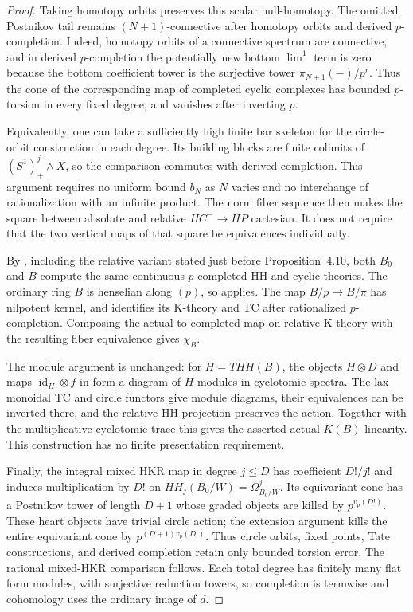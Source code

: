 \documentclass[11pt,a4paper]{amsart}
\numberwithin{equation}{section}
\theoremstyle{definition}
\theoremstyle{remark}
\begin{document}
\begin{proof}
Taking homotopy orbits preserves this scalar null-homotopy.
The omitted Postnikov tail remains $(N+1)$-connective after
homotopy orbits and derived $p$-completion. Indeed, homotopy
orbits of a connective spectrum are connective, and in derived
$p$-completion the potentially new bottom $\lim^1$ term is zero
because the bottom coefficient tower is the surjective tower
$\pi_{N+1}(-)/p^r$. Thus the cone of the corresponding map of
completed cyclic complexes has bounded $p$-torsion in every fixed
degree, and vanishes after inverting $p$.

Equivalently, one can take a sufficiently high finite bar skeleton
for the circle-orbit construction in each degree. Its building blocks
are finite colimits of $(S^1)^j_+\wedge X$, so the comparison commutes
with derived completion. This argument requires no uniform bound
$b_N$ as $N$ varies and no interchange of rationalization with an
infinite product. The norm fiber sequence then makes the square
between absolute and relative $HC^-\to HP$ cartesian. It does not
require that the two vertical maps of that square be equivalences
individually.

By \cite[Proposition~4.2]{AMMN}, including the relative variant
stated just before Proposition~4.10, both $B_0$ and $B$ compute
the same continuous $p$-completed HH and cyclic theories.
The ordinary ring $B$ is henselian along $(p)$, so
\cite[Theorem~A]{AMMN} applies. The map $B/p\to B/\pi$ has
nilpotent kernel, and \cite[Corollary~3.8]{AMMN} identifies its
K-theory and TC after rationalized $p$-completion. Composing the
actual-to-completed map on relative K-theory with the resulting
fiber equivalence gives $\chi_B$.

The module argument is unchanged: for $H=THH(B)$, the objects
$H\otimes D$ and maps $\operatorname{id}_H\otimes f$ in
\cite[Proposition~2.8, Corollary~2.10, and Theorem~2.12]{AMMN}
form a diagram of $H$-modules in cyclotomic spectra.
The lax monoidal TC and circle functors give module diagrams,
their equivalences can be inverted there, and the relative HH
projection preserves the action. Together with the
multiplicative cyclotomic trace this gives the asserted actual
$K(B)$-linearity. This construction has no finite presentation
requirement.

Finally, the integral mixed HKR map in degree $j\le D$ has
coefficient $D!/j!$ and induces multiplication by $D!$ on
$HH_j(B_0/W)=\Omega^j_{B_0/W}$. Its equivariant cone has a
Postnikov tower of length $D+1$ whose graded objects are killed
by $p^{v_p(D!)}$. These heart objects have trivial circle action;
the extension argument kills the entire equivariant cone by
$p^{(D+1)v_p(D!)}$. Thus circle orbits, fixed points, Tate
constructions, and derived completion retain only bounded
torsion error. The rational mixed-HKR comparison follows.
Each total degree has finitely many flat form modules, with
surjective reduction towers, so completion is termwise and
cohomology uses the ordinary image of $d$.
\end{proof}
\end{document}

